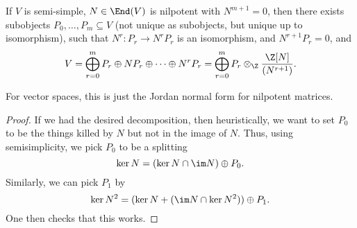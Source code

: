 \documentclass[a4paper]{article}
\begin{document}
\begin{thm}
  If $V$ is semi-simple, $N \in \End(V)$ is nilpotent with $N^{m + 1} = 0$, then there exists subobjects $P_0, \ldots, P_m \subseteq V$ (not unique as subobjects, but unique up to isomorphism), such that $N^r: P_r \to N^r P_r$ is an isomorphism, and $N^{r + 1} P_r = 0$, and
  \[
    V = \bigoplus_{r = 0}^m P_r \oplus N P_r \oplus \cdots \oplus N^r P_r = \bigoplus_{r = 0}^m P_r \otimes_\Z \frac{\Z[N]}{(N^{r + 1})}.
  \]
\end{thm}
For vector spaces, this is just the Jordan normal form for nilpotent matrices.
%
%
%
%
%
%
\begin{proof}
  If we had the desired decomposition, then heuristically, we want to set $P_0$ to be the things killed by $N$ but not in the image of $N$. Thus, using semisimplicity, we pick $P_0$ to be a splitting
  \[
    \ker N = (\ker N \cap \im N) \oplus P_0.
  \]
  Similarly, we can pick $P_1$ by
  \[
    \ker N^2 = (\ker N + (\im N \cap \ker N^2)) \oplus P_1.
  \]
  One then checks that this works.
%
\end{proof}
\end{document}
